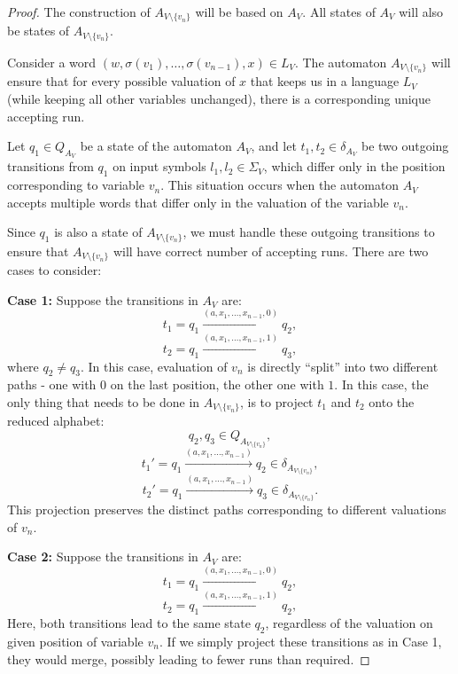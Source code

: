 \documentclass[12pt]{article}
\theoremstyle{definition}
\begin{document}
\begin{proof}
    The construction of $A_{V \setminus \{v_n\}}$ will be based on $A_V$. All states of $A_V$ will also be states of $A_{V \setminus \{v_n\}}$.
    
    Consider a word $(w, \sigma(v_1), \ldots, \sigma(v_{n-1}), x) \in L_V$. The automaton $A_{V \setminus \{v_n\}}$ will ensure that for every possible valuation of $x$ that keeps us in a language $L_V$ (while keeping all other variables unchanged), there is a corresponding unique accepting run.

    Let $q_1 \in Q_{A_V}$ be a state of the automaton $A_V$, and let $t_1, t_2 \in \delta_{A_V}$ be two outgoing transitions from $q_1$ on input symbols $l_1, l_2 \in \Sigma_V$, which differ only in the position corresponding to variable $v_n$. This situation occurs when the automaton $A_V$ accepts multiple words that differ only in the valuation of the variable $v_n$.

    Since $q_1$ is also a state of $A_{V \setminus \{v_n\}}$, we must handle these outgoing transitions to ensure that $A_{V \setminus \{v_n\}}$ will have correct number of accepting runs. There are two cases to consider:

    \textbf{Case 1:}
    Suppose the transitions in $A_V$ are:
    $$t_1 = q_1 \xrightarrow{(a, x_1, \ldots, x_{n-1}, 0)} q_2,$$
    $$t_2 = q_1 \xrightarrow{(a, x_1, \ldots, x_{n-1}, 1)} q_3,$$
    where $q_2 \neq q_3$. In this case, evaluation of $v_n$ is directly ``split'' into two different paths - one with $0$ on the last position, the other one with $1$. In this case, the only thing that needs to be done in $A_{V \setminus \{v_n\}}$, is to project $t_1$ and $t_2$ onto the reduced alphabet:
    $$q_2, q_3 \in Q_{A_{V \setminus \{v_n\}}},$$
    $$t_1' = q_1 \xrightarrow{(a, x_1, \ldots, x_{n-1})} q_2 \in \delta_{A_{V \setminus \{v_n\}}},$$
    $$t_2' = q_1 \xrightarrow{(a, x_1, \ldots, x_{n-1})} q_3 \in \delta_{A_{V \setminus \{v_n\}}}.$$
    This projection preserves the distinct paths corresponding to different valuations of $v_n$.

    \textbf{Case 2:}
    Suppose the transitions in $A_V$ are:
    $$t_1 = q_1 \xrightarrow{(a, x_1, \ldots, x_{n-1}, 0)} q_2,$$
    $$t_2 = q_1 \xrightarrow{(a, x_1, \ldots, x_{n-1}, 1)} q_2,$$
    Here, both transitions lead to the same state $q_2$, regardless of the valuation on given position of variable $v_n$. If we simply project these transitions as in Case 1, they would merge, possibly leading to fewer runs than required.


\end{proof}
\end{document}

